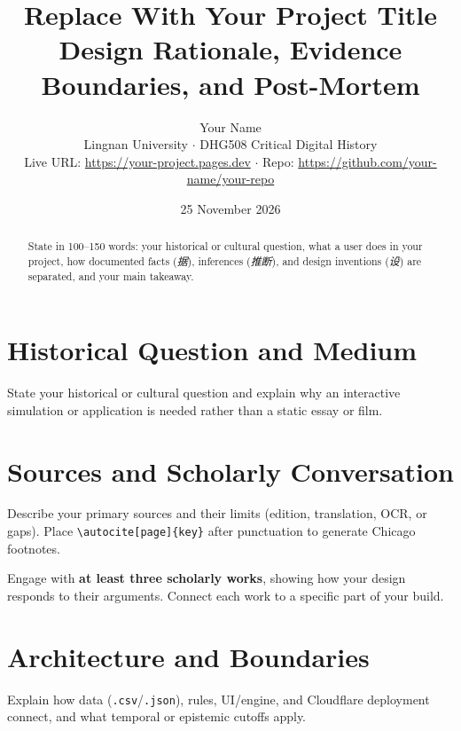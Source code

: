 \documentclass[12pt,a4paper]{article}
\title{\textbf{Replace With Your Project Title}\\[0.3em]
\large Design Rationale, Evidence Boundaries, and Post-Mortem}
\author{Your Name\\Lingnan University $\cdot$ DHG508 Critical Digital History\\
\small Live URL: \url{https://your-project.pages.dev} $\cdot$ Repo: \url{https://github.com/your-name/your-repo}}
\date{25 November 2026}
\begin{document}
\maketitle

\begin{abstract}
\noindent
State in 100--150 words: your historical or cultural question, what a user does
in your project, how documented facts (\emph{据}), inferences (\emph{推断}), and
design inventions (\emph{设}) are separated, and your main takeaway.
\end{abstract}

\onehalfspacing

\section{Historical Question and Medium}

State your historical or cultural question and explain why an interactive
simulation or application is needed rather than a static essay or film.

\section{Sources and Scholarly Conversation}

Describe your primary sources and their limits (edition, translation, OCR, or
gaps).\autocite[150, 152]{tobin1986macro} Place \verb|\autocite[page]{key}| after
punctuation to generate Chicago footnotes.\autocite{conference1986}

Engage with \textbf{at least three scholarly works}, showing how your design
responds to their arguments.\autocite[158--160]{gewirtz2017unlikely} Connect each
work to a specific part of your build.\autocite[195--199]{weber2021shock}

\section{Architecture and Boundaries}

Explain how data (\texttt{.csv}/\texttt{.json}), rules, UI/engine, and Cloudflare
deployment connect, and what temporal or epistemic cutoffs apply.

\end{document}
